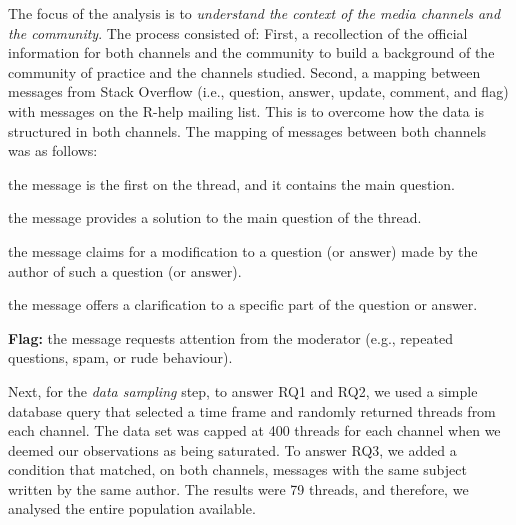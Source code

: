 \documentclass{sig-alternate-05-2015}
\begin{document}

	The focus of the analysis is to \textit{understand the context of the media channels and the community}.
	The process consisted of:
	First, a recollection of the official information for both channels and the community to build a background of the community of practice and the channels studied.
	Second, a mapping between messages from Stack Overflow (i.e., question, answer, update, comment, and flag) with messages on the R-help mailing list.
    This is to overcome how the data is structured in both channels.
    The mapping of messages between both channels was as follows:

	\begin{description}
      \setlength{\itemsep}{3pt}
      \setlength{\parskip}{0pt}
      \setlength{\parsep}{0pt}
		\item[Question:] the message is the first on the thread, and it contains the main question.
		\item[Answer:] the message provides a solution to the main question of the thread.
	 	\item[Update:] the message claims for a modification to a question (or answer) made by the author of such a question (or answer).
		\item[Comment:] the message offers a clarification to a specific part of the question or answer.
		\item \textbf{Flag:} the message requests attention from the moderator (e.g., repeated questions, spam, or rude behaviour).
	\end{description}

	Next, for the \textit{data sampling} step, to answer RQ1 and RQ2, we used a simple database query that selected a time frame and randomly returned threads from each channel.
	The data set was capped at 400 threads for each channel when we deemed our observations as being saturated.
	To answer RQ3, we added a condition that matched, on both channels, messages with the same subject written by the same author.
	The results were 79 threads, and therefore, we analysed the entire population available. 
\end{document}

